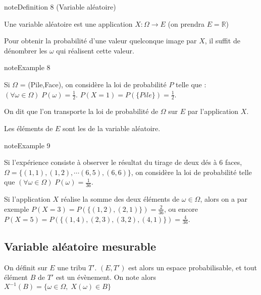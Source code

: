 \documentclass[letterpaper,10pt,english]{jupyterBook}
\begin{document}
\ignorespaces \label{Rappels:definition-18}
\begin{sphinxadmonition}{note}{Definition 8 (Variable aléatoire)}



\sphinxAtStartPar
Une variable aléatoire est une application \(X:\Omega\rightarrow E\) (on prendra \(E=\mathbb R\))
\end{sphinxadmonition}

\sphinxAtStartPar
Pour obtenir la probabilité d’une valeur quelconque image par \(X\), il suffit de dénombrer les \(\omega\) qui réalisent cette valeur.
\label{Rappels:example-19}
\begin{sphinxadmonition}{note}{Example 8}



\sphinxAtStartPar
Si \(\Omega\) = (Pile,Face), on considère la loi de probabilité \(P\) telle que : \((\forall \omega\in\Omega)\; P(\omega)=\frac12\).
\(P(X=1)= P(\{Pile\}) = \frac12\).
\end{sphinxadmonition}

\sphinxAtStartPar
On dit que l’on transporte la loi de probabilité de \(\Omega\) sur \(E\) par l’application \(X\).

\sphinxAtStartPar
Les éléments de \(E\) sont les  de la variable aléatoire.
\label{Rappels:example-20}
\begin{sphinxadmonition}{note}{Example 9}



\sphinxAtStartPar
Si l’expérience consiste à observer le résultat du tirage de deux dés à 6 faces, \(\Omega = \{(1,1), (1,2), \cdots (6,5), (6,6)\}\), on considère la loi de probabilité telle que \((\forall \omega\in\Omega)\; P(\omega)=\frac{1}{36}\).

\sphinxAtStartPar
Si l’application \(X\) réalise la somme des deux éléments de \(\omega\in\Omega\), alors on a par exemple \(P(X=3)= P(\{(1,2),(2,1)\}) = \frac{2}{36}\), ou encore \(P(X=5)= P(\{(1,4),(2,3),(3,2),(4,1)\}) = \frac{4}{36}\).
\end{sphinxadmonition}


\subsection{Variable aléatoire mesurable}
\label{\detokenize{Rappels:variable-aleatoire-mesurable}}
\sphinxAtStartPar
On définit sur \(E\) une tribu \(T'\).  \((E,T')\) est alors un espace probabilisable, et tout élément \(B\) de \(T'\) est un évènement. On note alors \(X^{-1}(B) = \{\omega\in\Omega,\; X(\omega)\in B\}\)
\end{document}
